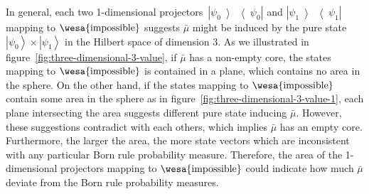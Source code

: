 \documentclass{article}
\theoremstyle{remark}
\newcommand{\imposs}{{\mbox{\wesa{impossible}}}}
\newcommand{\ket}[1]{{\left\vert{#1}\right\rangle}}
\newcommand{\op}[2]{\ensuremath{\left\vert{#1}\middle\rangle\middle\langle{#2}\right\vert}}
\newcommand{\proj}[1]{\op{#1}{#1}}
\begin{document}
In general, each two 1-dimensional projectors~$\proj{\psi_{0}}$
and $\proj{\psi_{1}}$ mapping to $\imposs$ suggests $\bar{\mu}$
might be induced by the pure state~$\ket{\psi_{0}}\times\ket{\psi_{1}}$
in the Hilbert space of dimension 3. As we illustrated in figure~\ref{fig:three-dimensional-3-value},
if $\bar{\mu}$ has a non-empty core, the states mapping to $\imposs$
is contained in a plane, which contains no area in the sphere. On
the other hand, if the states mapping to $\imposs$ contain some area
in the sphere as in figure~\ref{fig:three-dimensional-3-value-1},
each plane intersecting the area suggests different pure state inducing
$\bar{\mu}$. However, these suggestions contradict with each others,
which implies $\bar{\mu}$ has an empty core. Furthermore, the larger
the area, the more state vectors which are inconsistent with any particular
Born rule probability measure. Therefore, the area of the 1-dimensional
projectors mapping to $\imposs$ could indicate how much $\bar{\mu}$
deviate from the Born rule probability measures.
\end{document}

